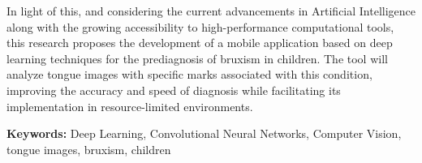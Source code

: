 In light of this, and considering the current advancements in Artificial Intelligence along with the growing accessibility to high-performance computational tools, this research proposes the development of a mobile application based on deep learning techniques for the prediagnosis of bruxism in children. The tool will analyze tongue images with specific marks associated with this condition, improving the accuracy and speed of diagnosis while facilitating its implementation in resource-limited environments.


\textbf{Keywords: }Deep Learning, Convolutional Neural Networks, Computer Vision, tongue images, bruxism, children